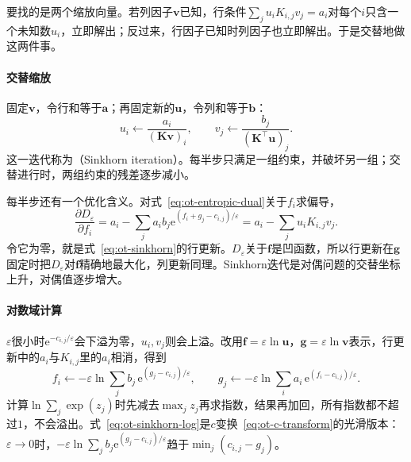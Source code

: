 要找的是两个缩放向量。若列因子$\bm{v}$已知，行条件$\sum_ju_iK_{i,j}v_j=a_i$对每个$i$只含一个未知数$u_i$，立即解出；反过来，行因子已知时列因子也立即解出。于是交替地做这两件事。

\paragraph{交替缩放}
固定$\bm{v}$，令行和等于$\bm{a}$；再固定新的$\bm{u}$，令列和等于$\bm{b}$：
\begin{equation}
 u_i\leftarrow\frac{a_i}{(\bm{K}\bm{v})_i},\qquad v_j\leftarrow\frac{b_j}{(\bm{K}^{\top}\bm{u})_j}.
 \label{eq:ot-sinkhorn}
\end{equation}
这一迭代称为（Sinkhorn iteration）。每半步只满足一组约束，并破坏另一组；交替进行时，两组约束的残差逐步减小。

每半步还有一个优化含义。对式~\eqref{eq:ot-entropic-dual}关于$f_i$求偏导，
\[
 \frac{\partial D_\varepsilon}{\partial f_i}=a_i-\sum_ja_ib_j\mathrm{e}^{(f_i+g_j-c_{i,j})/\varepsilon}=a_i-\sum_ju_iK_{i,j}v_j .
\]
令它为零，就是式~\eqref{eq:ot-sinkhorn}的行更新。$D_\varepsilon$关于$\bm{f}$是凹函数，所以行更新在$\bm{g}$固定时把$D_\varepsilon$对$\bm{f}$精确地最大化，列更新同理。Sinkhorn迭代是对偶问题的交替坐标上升，对偶值逐步增大。

\paragraph{对数域计算}
$\varepsilon$很小时$\mathrm{e}^{-c_{i,j}/\varepsilon}$会下溢为零，$u_i,v_j$则会上溢。改用$\bm{f}=\varepsilon\ln\bm{u}$，$\bm{g}=\varepsilon\ln\bm{v}$表示，行更新中的$a_i$与$K_{i,j}$里的$a_i$相消，得到
\begin{equation}
 f_i\leftarrow-\varepsilon\ln\sum_jb_j\,\mathrm{e}^{(g_j-c_{i,j})/\varepsilon},\qquad g_j\leftarrow-\varepsilon\ln\sum_ia_i\,\mathrm{e}^{(f_i-c_{i,j})/\varepsilon}.
 \label{eq:ot-sinkhorn-log}
\end{equation}
计算$\ln\sum_j\exp(z_j)$时先减去$\max_jz_j$再求指数，结果再加回，所有指数都不超过$1$，不会溢出。式~\eqref{eq:ot-sinkhorn-log}是$c$变换~\eqref{eq:ot-c-transform}的光滑版本：$\varepsilon\to0$时，$-\varepsilon\ln\sum_jb_j\mathrm{e}^{(g_j-c_{i,j})/\varepsilon}$趋于$\min_j(c_{i,j}-g_j)$。

